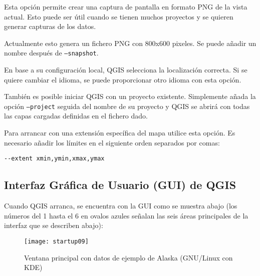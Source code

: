 \begin{Tip} \caption{\textsc{Ejemplo utilizando argumentos en línea de órdenes}}
\end{Tip}

Esta opción permite crear una captura de pantalla en formato PNG de la vista actual.
Esto puede ser útil cuando se tienen muchos proyectos y se quieren generar capturas de los datos.

Actualmente esto genera un fichero PNG con 800x600 pixeles. Se puede añadir un nombre después de
\texttt{---snapshot}.

En base a su configuración local, QGIS selecciona la localización correcta. Si se quiere cambiar el idioma,
se puede proporcionar otro idioma con esta opción.

También es posible iniciar QGIS con un proyecto existente. Simplemente añada 
la opción \texttt{--project} seguida del nombre de su proyecto y QGIS se abrirá 
con todas las capas cargadas definidas en el fichero dado.

Para arrancar con una extensión específica del mapa utilice esta opción. Es necesario
añadir los límites en el siguiente orden separados por comas:
\begin{verbatim}
--extent xmin,ymin,xmax,ymax
\end{verbatim}


\subsection{Interfaz Gráfica de Usuario (GUI) de QGIS}
\label{label_qgismainwindow}

Cuando QGIS arranca, se encuentra con la GUI como se muestra abajo
(los números del 1 hasta el 6 en ovalos azules señalan las seis áreas principales 
de la interfaz que se describen abajo):

\begin{figure}[ht]
   \begin{center}
   \caption{Ventana principal con datos de ejemplo de Alaska (GNU/Linux con KDE)}\label{fig:startup}
   \texttt{[image: startup09]}
\end{center} 
\end{figure}

